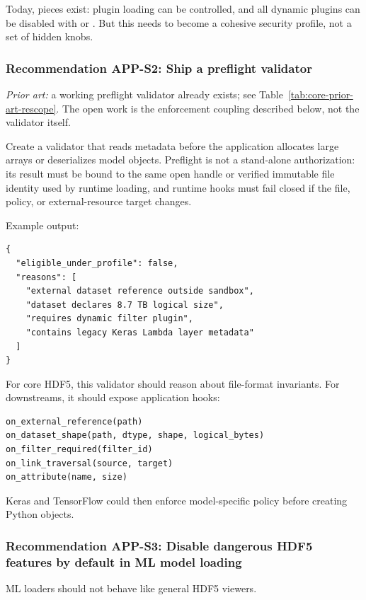 \documentclass[../main.tex]{subfiles}
\begin{document}
Today, pieces exist: plugin loading can be controlled, and all dynamic plugins
can be disabled with  or .
But this needs to become a cohesive security profile, not a set of hidden knobs.

\subsubsection*{Recommendation APP-S2: Ship a preflight validator}

\noindent\emph{Prior art:} a working preflight validator already exists; see
Table~\ref{tab:core-prior-art-rescope}. The open work is the enforcement
coupling described below, not the validator itself.

Create a validator that reads metadata before the application allocates large
arrays or deserializes model objects. Preflight is not a stand-alone
authorization: its result must be bound to the same open handle or verified
immutable file identity used by runtime loading, and runtime hooks must fail
closed if the file, policy, or external-resource target changes.

Example output:
\begin{verbatim}
{
  "eligible_under_profile": false,
  "reasons": [
    "external dataset reference outside sandbox",
    "dataset declares 8.7 TB logical size",
    "requires dynamic filter plugin",
    "contains legacy Keras Lambda layer metadata"
  ]
}    
\end{verbatim}

For core HDF5, this validator should reason about file-format invariants.
For downstreams, it should expose application hooks:

\begin{verbatim}
on_external_reference(path)
on_dataset_shape(path, dtype, shape, logical_bytes)
on_filter_required(filter_id)
on_link_traversal(source, target)
on_attribute(name, size)
\end{verbatim}

Keras and TensorFlow could then enforce model-specific policy before creating Python objects.

\subsubsection*{Recommendation APP-S3: Disable dangerous HDF5 features by default in ML model loading}

ML loaders should not behave like general HDF5 viewers.
\end{document}
